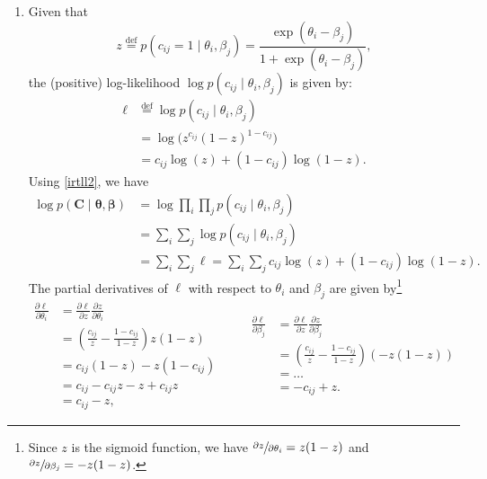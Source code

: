 \documentclass[10pt]{article}
\renewcommand{\bf}[1]{\mathbf{#1}}
\newcommand{\eqdef}[0]{\stackrel{\text{def}}{=}}
\begin{document}
\begin{enumerate}
    \begin{enumerate}[label = \textbf{\alph*}.]
        \item Given that
        $$
            z\eqdef p(c_{ij}=1\mid \theta_i,\beta_j)=\frac{\exp(\theta_i-\beta_j)}{1+\exp(\theta_i-\beta_j)},
        $$
        the (positive) log-likelihood $\log p(c_{ij}\mid \theta_i,\beta_j)$
        is given by:
        \begin{equation}
            \begin{aligned}
                \ell 
                &\eqdef \log p(c_{ij}\mid \theta_i,\beta_j) \\
                &= \log\!\Big( z^{c_{ij}}(1-z)^{1-c_{ij}} \Big) \\
                &= c_{ij}\log (z) + (1-c_{ij}) \log (1-z).
            \end{aligned}
            \label{irtll2}
        \end{equation}
        Using \eqref{irtll2}, we have
        $$
            \begin{aligned}
                \log p(\bf C\mid\bm\theta,\bm\beta)
                &= \log \prod_i \prod_j p(c_{ij}\mid \theta_i,\beta_j) \\
                &= \sum_i\sum_j \log p(c_{ij}\mid \theta_i,\beta_j) \\
                &= \sum_i\sum_j \ell = \sum_i\sum_j c_{ij}\log (z) + (1-c_{ij}) \log (1-z).
            \end{aligned}
        $$
        The partial derivatives of $\ell$ with respect to $\theta_i$ and $\beta_j$ are given by\footnote{Since $z$ is the sigmoid function, we have $\sfrac{\partial z}{\partial \theta_i}=z(1-z)$ and $\sfrac{\partial z}{\partial \beta_j}=-z(1-z)$.}
        $$
            \begin{aligned}
                \frac{\partial\ell}{\partial \theta_i}
                &= \frac{\partial\ell}{\partial z}\frac{\partial z}{\partial \theta_i} \\
                &= \left(\frac{c_{ij}}{z}-\frac{1-c_{ij}}{1-z}\right)z(1-z) \\
                &= c_{ij}(1-z)-z(1-c_{ij}) \\
                &= c_{ij}-c_{ij}z-z+c_{ij}z \\ 
                &= c_{ij}-z,
            \end{aligned}
            \quad \quad
            \begin{aligned}
                \frac{\partial\ell}{\partial \beta_j}
                &= \frac{\partial\ell}{\partial z}\frac{\partial z}{\partial \beta_j} \\
                &= \left(\frac{c_{ij}}{z}-\frac{1-c_{ij}}{1-z}\right)(-z(1-z)) \\
                &= \dots \\
                &= -c_{ij}+z.
            \end{aligned}
        $$


\end{enumerate}
\end{enumerate}
\end{document}
